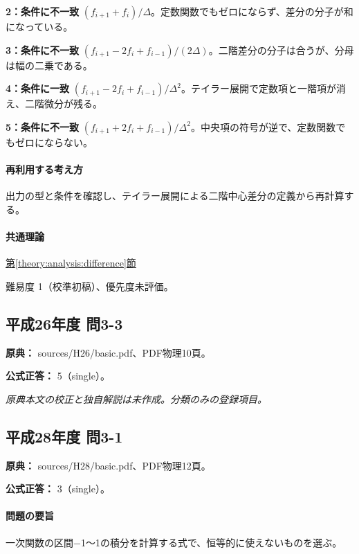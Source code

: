\noindent\textbf{2：条件に不一致} \((f_{i+1}+f_i)/\Delta\)。定数関数でもゼロにならず、差分の分子が和になっている。\par

\noindent\textbf{3：条件に不一致} \((f_{i+1}-2f_i+f_{i-1})/(2\Delta)\)。二階差分の分子は合うが、分母は幅の二乗である。\par

\noindent\textbf{4：条件に一致} \((f_{i+1}-2f_i+f_{i-1})/\Delta^2\)。テイラー展開で定数項と一階項が消え、二階微分が残る。\par

\noindent\textbf{5：条件に不一致} \((f_{i+1}+2f_i+f_{i-1})/\Delta^2\)。中央項の符号が逆で、定数関数でもゼロにならない。\par

\paragraph{再利用する考え方} 出力の型と条件を確認し、テイラー展開による二階中心差分の定義から再計算する。

\paragraph{共通理論} \hyperref[theory:analysis:difference]{第\ref*{theory:analysis:difference}節}

\par 難易度 1（校準初稿）、優先度未評価。

\subsection{平成26年度 問3-3}
\label{q:h26-reg-basic-3-3}

\noindent\textbf{原典：} sources/H26/basic.pdf、PDF物理10頁。

\textbf{公式正答：} 5（single）。

\par\textit{原典本文の校正と独自解説は未作成。分類のみの登録項目。}

\subsection{平成28年度 問3-1}
\label{q:h28-reg-basic-3-1}

\noindent\textbf{原典：} sources/H28/basic.pdf、PDF物理12頁。

\textbf{公式正答：} 3（single）。

\paragraph{問題の要旨} 一次関数の区間−1〜1の積分を計算する式で、恒等的に使えないものを選ぶ。

